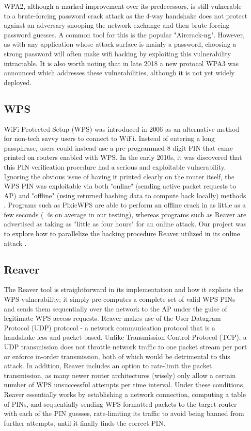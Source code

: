 \documentclass[a4paper]{article}
\begin{document}
WPA2, although a marked improvement over its predecessors, is still vulnerable to a brute-forcing password crack attack as the 4-way handshake does not protect against an adversary snooping the network exchange and then brute-forcing password guesses. A common tool for this is the popular "Aircrack-ng". However, as with any application whose attack surface is mainly a password, choosing a strong password will often make wifi hacking by exploiting this vulnerability intractable. It is also worth noting that in late 2018 a new protocol WPA3 was announced which addresses these vulnerabilities, although it is not yet widely deployed.

\subsection{WPS}
WiFi Protected Setup (WPS) was introduced in 2006 as an alternative method for non-tech 
savvy users to connect to WiFi. Instead of entering a long passphrase, users could instead
use a pre-programmed 8 digit PIN that came printed on routers enabled with WPS. In the 
early 2010s, it was discovered that this PIN verification procedure had a serious and
exploitable vulnerability. Ignoring the obvious issue of having it printed clearly
on the router itself, the WPS PIN was exploitable via both "online" (sending active packet requests to AP) 
and "offline" (using returned hashing data to compute hack locally) methods \cite{vanhoef}. Programs such as PixieWPS are 
able to perform an offline crack in as little as a few seconds (~4s on average in our testing), whereas programs such as Reaver are advertised 
as taking as "little as four hours" for an online attack. Our project was to explore how to parallelize the 
hacking procedure Reaver utilized in its online attack \cite{viehbock}.

\subsection{Reaver}
The Reaver tool is straightforward in its implementation and how it exploits the WPS vulnerability; it simply pre-computes a complete set of valid WPS PINs and sends them sequentially over the network to the AP under the guise of legitimate WPS access requests. Reaver makes use of the User Datagram Protocol (UDP) protocol - a network communication protocol that is a handshake less and packet-based. Unlike Transmission Control Protocol (TCP), a UDP transmission does not throttle network traffic to one packet stream per port or enforce in-order transmission, both of which would be detrimental to this attack.  In addition, Reaver includes an option to rate-limit the packet transmission, as many newer router architectures (wisely) only allow a certain number of WPS unsuccessful attempts per time interval. Under these conditions, Reaver essentially works by establishing a network connection, computing a table of PINs, and sequentially sending WPS-formatted packets to the target router with each of the PIN guesses, rate-limiting its traffic to avoid being banned from further attempts, until it finally finds the correct PIN.
\end{document}
